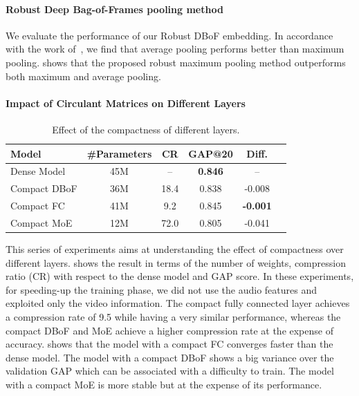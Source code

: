 \paragraph{Robust Deep Bag-of-Frames pooling method}
\label{subsection:ap2-robust_deep_bag-of-frames_pooling_method_experiements}


We evaluate the performance of our Robust DBoF embedding.
In accordance with the work of~\citet{abu2016youtube}, we find that average pooling performs better than maximum pooling. 
 shows that the proposed robust maximum pooling method outperforms both maximum and average pooling.


\paragraph{Impact of Circulant Matrices on Different Layers}

\begin{table}[ht]
  \centering
  \begin{tabular}{lccccc}
    \toprule
    \textbf{Model} & \textbf{\#Parameters} & \textbf{CR} & \textbf{GAP@20} & \textbf{Diff.} \\
    \midrule
    Dense Model  & 45M &   -- & \textbf{0.846} & -- \\
    Compact DBoF & 36M & 18.4 & 0.838 & -0.008\\
    Compact FC   & 41M &  9.2 & 0.845 & \textbf{-0.001} \\
    Compact MoE  & 12M & 72.0 & 0.805 & -0.041 \\
   \bottomrule
  \end{tabular}
  \caption{Effect of the compactness of different layers.} 
  \label{table:ap4-circulant_layer}
\end{table}



This series of experiments aims at understanding the effect of compactness over different layers.
 shows the result in terms of the number of weights, compression ratio (CR) with respect to the dense model and GAP score.
In these experiments, for speeding-up the training phase, we did not use the audio features and exploited only the video information.
The compact fully connected layer achieves a compression rate of 9.5 while having a very similar performance, whereas the compact DBoF and MoE achieve a higher compression rate at the expense of accuracy. 
 shows that the model with a compact FC converges faster than the dense model.
The model with a compact DBoF shows a big variance over the validation GAP which can be associated with a difficulty to train.
The model with a compact MoE is more stable but at the expense of its performance.

